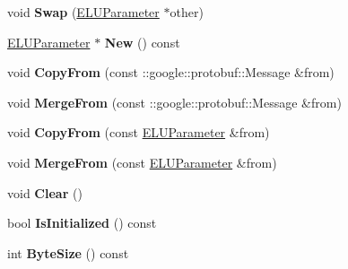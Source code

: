 \begin{DoxyCompactItemize}
\item 
\mbox{\label{classcaffe_1_1_e_l_u_parameter_a4f8841bb3467e1565561dfd842ee1e30}} 
void {\bfseries Swap} (\mbox{\hyperlink{classcaffe_1_1_e_l_u_parameter}{E\+L\+U\+Parameter}} $\ast$other)
\item 
\mbox{\label{classcaffe_1_1_e_l_u_parameter_a367ac15124ebbe27810f04584eb71f37}} 
\mbox{\hyperlink{classcaffe_1_1_e_l_u_parameter}{E\+L\+U\+Parameter}} $\ast$ {\bfseries New} () const
\item 
\mbox{\label{classcaffe_1_1_e_l_u_parameter_a62bba80856f588e36b4a6fea4314ea53}} 
void {\bfseries Copy\+From} (const \+::google\+::protobuf\+::\+Message \&from)
\item 
\mbox{\label{classcaffe_1_1_e_l_u_parameter_ad6f711386a18d2d65a753e97425815e1}} 
void {\bfseries Merge\+From} (const \+::google\+::protobuf\+::\+Message \&from)
\item 
\mbox{\label{classcaffe_1_1_e_l_u_parameter_a970a6d9e3abc017e839a7313cc8120a8}} 
void {\bfseries Copy\+From} (const \mbox{\hyperlink{classcaffe_1_1_e_l_u_parameter}{E\+L\+U\+Parameter}} \&from)
\item 
\mbox{\label{classcaffe_1_1_e_l_u_parameter_a316441369c1760d3b5b134d11f49d7cc}} 
void {\bfseries Merge\+From} (const \mbox{\hyperlink{classcaffe_1_1_e_l_u_parameter}{E\+L\+U\+Parameter}} \&from)
\item 
\mbox{\label{classcaffe_1_1_e_l_u_parameter_a324ec83f799922c6806fa15f3d25ae43}} 
void {\bfseries Clear} ()
\item 
\mbox{\label{classcaffe_1_1_e_l_u_parameter_a50f1304d297c47cd5db56e7c8706ec75}} 
bool {\bfseries Is\+Initialized} () const
\item 
\mbox{\label{classcaffe_1_1_e_l_u_parameter_a873a1b19de2dcfb04716880d368336e6}} 
int {\bfseries Byte\+Size} () const
\item 
\mbox{\label{classcaffe_1_1_e_l_u_parameter_a6b4e08b2555ed11076afffe5629bbf7b}} 

\end{DoxyCompactItemize}
